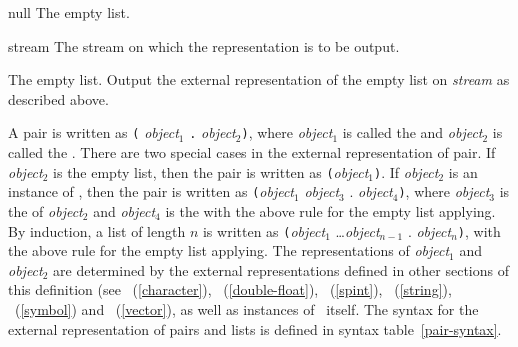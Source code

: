 \begin{optDefinition}
%
\begin{specargs}
    \item[null] The empty list.
    \item[stream] The stream on which the representation is to be output.
\end{specargs}
%
\result%
The empty list.
%
\remarks%
Output the external representation of the empty list on {\em stream\/}
as described above.

%
A pair is written as \verb+(+{\em
    object}$_1$ \verb+.+ {\em object}$_2$\verb+)+, where {\em object}$_1$ is
called the  and {\em object}$_2$ is called the
.  There are two special cases in the external representation
of pair.  If {\em object}$_2$ is the empty list, then the pair is written as
\verb+(+{\em object}$_1$\verb+)+.  If {\em object$_2$} is an instance of
, then the pair is written as \verb+(+{\em object}$_1$ {\em
    object}$_3$ . {\em object$_4$}\verb+)+, where {\em object$_3$} is the
 of {\em object$_2$} and {\em object$_4$} is the
 with the above rule for the empty list applying.  By
induction, a list of length $n$ is written as \verb+(+{\em object}$_1$ \ldots {\em object$_{n-1}$}
. {\em object}$_n$\verb+)+, with the above rule for the empty list applying.
The representations of {\em object$_1$} and {\em object$_2$} are determined by
the external representations defined in other sections of this definition (see
\ (\ref{character}), \
(\ref{double-float}),
\ (\ref{spint}),
\ (\ref{string}),
\ (\ref{symbol}) and
\ (\ref{vector}), as well as instances of \
itself.  The syntax for the external representation of pairs and lists
is defined in syntax table~\ref{pair-syntax}.


\end{optDefinition}
